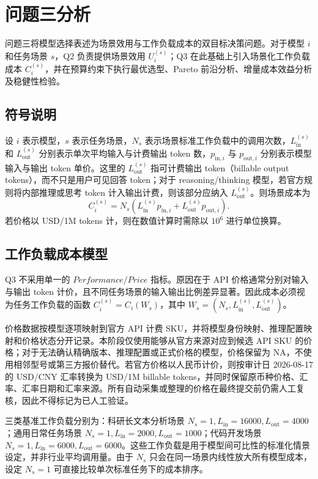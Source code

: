 \section{问题三分析}

问题三将模型选择表述为场景效用与工作负载成本的双目标决策问题。对于模型 $i$ 和任务场景 $s$，Q2 负责提供场景效用 $U_i^{(s)}$；Q3 在此基础上引入场景化工作负载成本 $C_i^{(s)}$，并在预算约束下执行最优选型、Pareto 前沿分析、增量成本效益分析及稳健性检验。

\subsection{符号说明}

设 $i$ 表示模型，$s$ 表示任务场景，$N_s$ 表示场景标准工作负载中的调用次数，$L_{\mathrm{in}}^{(s)}$ 和 $L_{\mathrm{out}}^{(s)}$ 分别表示单次平均输入与计费输出 token 数，$p_{\mathrm{in},i}$ 与 $p_{\mathrm{out},i}$ 分别表示模型输入与输出 token 单价。这里的 $L_{\mathrm{out}}^{(s)}$ 指可计费输出 token（billable output tokens），而不只是用户可见回答 token；对于 reasoning/thinking 模型，若官方规则将内部推理或思考 token 计入输出计费，则该部分应纳入 $L_{\mathrm{out}}^{(s)}$。则场景成本为
\[
C_i^{(s)} = N_s\left(L_{\mathrm{in}}^{(s)}p_{\mathrm{in},i} + L_{\mathrm{out}}^{(s)}p_{\mathrm{out},i}\right).
\]
若价格以 USD/1M tokens 计，则在数值计算时需除以 $10^6$ 进行单位换算。

\subsection{工作负载成本模型}

Q3 不采用单一的 $Performance/Price$ 指标。原因在于 API 价格通常分别对输入与输出 token 计价，且不同任务场景的输入输出比例差异显著。因此成本必须视为任务工作负载的函数 $C_i^{(s)} = C_i(W_s)$，其中 $W_s=(N_s,L_{\mathrm{in}}^{(s)},L_{\mathrm{out}}^{(s)})$。

价格数据按模型逐项映射到官方 API 计费 SKU，并将模型身份映射、推理配置映射和价格状态分开记录。本阶段仅使用能够从官方来源对应到候选 API SKU 的价格；对于无法确认精确版本、推理配置或正式价格的模型，价格保留为 NA，不使用相邻型号或第三方报价替代。若官方价格以人民币计价，则按审计日 2026-08-17 的 USD/CNY 汇率转换为 USD/1M billable tokens，并同时保留原币种价格、汇率、汇率日期和汇率来源。所有自动采集或整理的价格在最终提交前仍需人工复核，因此不得标记为已人工验证。

三类基准工作负载分别为：科研长文本分析场景 $N_s=1, L_{\mathrm{in}}=16000, L_{\mathrm{out}}=4000$；通用日常任务场景 $N_s=1, L_{\mathrm{in}}=2000, L_{\mathrm{out}}=1000$；代码开发场景 $N_s=1, L_{\mathrm{in}}=6000, L_{\mathrm{out}}=6000$。这些工作负载是用于模型间可比性的标准化情景设定，并非行业平均调用量。由于 $N_s$ 只会在同一场景内线性放大所有模型成本，设定 $N_s=1$ 可直接比较单次标准任务下的成本排序。

